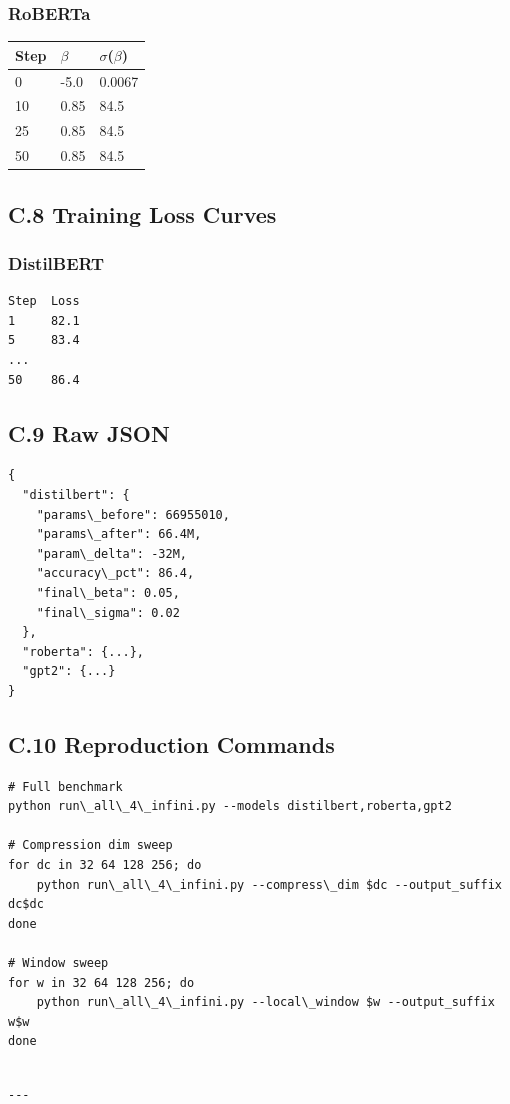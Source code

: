 \subsubsection{RoBERTa}

\begin{table}[H]
\centering
\small
\begin{tabular}{lll}
\toprule
\textbf{Step} & \textbf{$\beta$} & \textbf{$\sigma$($\beta$)} \\
\midrule
0 & -5.0 & 0.0067 \\
10 & 0.85 & 84.5 \\
25 & 0.85 & 84.5 \\
50 & 0.85 & 84.5 \\
\bottomrule
\end{tabular}
\end{table}

\subsection{C.8 Training Loss Curves}

\subsubsection{DistilBERT}
\begin{lstlisting}
Step  Loss
1     82.1
5     83.4
...
50    86.4
\end{lstlisting}

\subsection{C.9 Raw JSON}

\begin{lstlisting}
{
  "distilbert": {
    "params\_before": 66955010,
    "params\_after": 66.4M,
    "param\_delta": -32M,
    "accuracy\_pct": 86.4,
    "final\_beta": 0.05,
    "final\_sigma": 0.02
  },
  "roberta": {...},
  "gpt2": {...}
}
\end{lstlisting}

\subsection{C.10 Reproduction Commands}

\begin{lstlisting}
# Full benchmark
python run\_all\_4\_infini.py --models distilbert,roberta,gpt2

# Compression dim sweep
for dc in 32 64 128 256; do
    python run\_all\_4\_infini.py --compress\_dim $dc --output_suffix dc$dc
done

# Window sweep
for w in 32 64 128 256; do
    python run\_all\_4\_infini.py --local\_window $w --output_suffix w$w
done
\end{lstlisting}
\begin{lstlisting}

---
\end{lstlisting}

